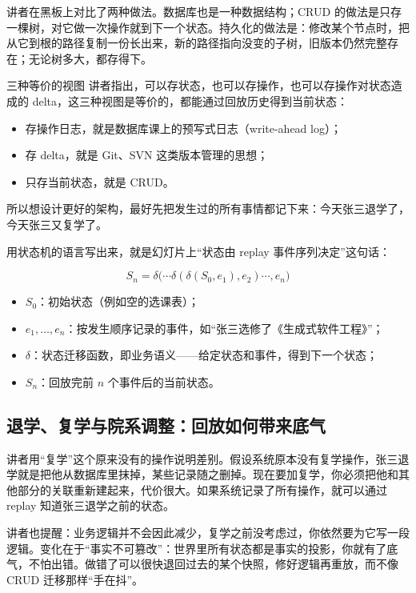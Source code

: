 \documentclass[a4paper]{article}
\begin{document}
讲者在黑板上对比了两种做法。数据库也是一种数据结构；CRUD 的做法是只存一棵树，对它做一次操作就到下一个状态。持久化的做法是：修改某个节点时，把从它到根的路径复制一份长出来，新的路径指向没变的子树，旧版本仍然完整存在；无论树多大，都存得下。

\begin{importantbox}{三种等价的视图}
讲者指出，可以存状态，也可以存操作，也可以存操作对状态造成的 delta，这三种视图是等价的，都能通过回放历史得到当前状态：
\begin{itemize}
  \item 存操作日志，就是数据库课上的预写式日志（write-ahead log）；
  \item 存 delta，就是 Git、SVN 这类版本管理的思想；
  \item 只存当前状态，就是 CRUD。
\end{itemize}
所以想设计更好的架构，最好先把发生过的所有事情都记下来：今天张三退学了，今天张三又复学了。
\end{importantbox}

用状态机的语言写出来，就是幻灯片上“状态由 replay 事件序列决定”这句话：

\[
S_n = \delta\bigl(\cdots\delta(\delta(S_0, e_1), e_2)\cdots, e_n\bigr)
\]

\begin{itemize}
  \item $S_0$：初始状态（例如空的选课表）；
  \item $e_1,\dots,e_n$：按发生顺序记录的事件，如“张三选修了《生成式软件工程》”；
  \item $\delta$：状态迁移函数，即业务语义——给定状态和事件，得到下一个状态；
  \item $S_n$：回放完前 $n$ 个事件后的当前状态。
\end{itemize}

\subsection{退学、复学与院系调整：回放如何带来底气}

讲者用“复学”这个原来没有的操作说明差别。假设系统原本没有复学操作，张三退学就是把他从数据库里抹掉，某些记录随之删掉。现在要加复学，你必须把他和其他部分的关联重新建起来，代价很大。如果系统记录了所有操作，就可以通过 replay 知道张三退学之前的状态。

讲者也提醒：业务逻辑并不会因此减少，复学之前没考虑过，你依然要为它写一段逻辑。变化在于“事实不可篡改”：世界里所有状态都是事实的投影，你就有了底气，不怕出错。做错了可以很快退回过去的某个快照，修好逻辑再重放，而不像 CRUD 迁移那样“手在抖”。
\end{document}
